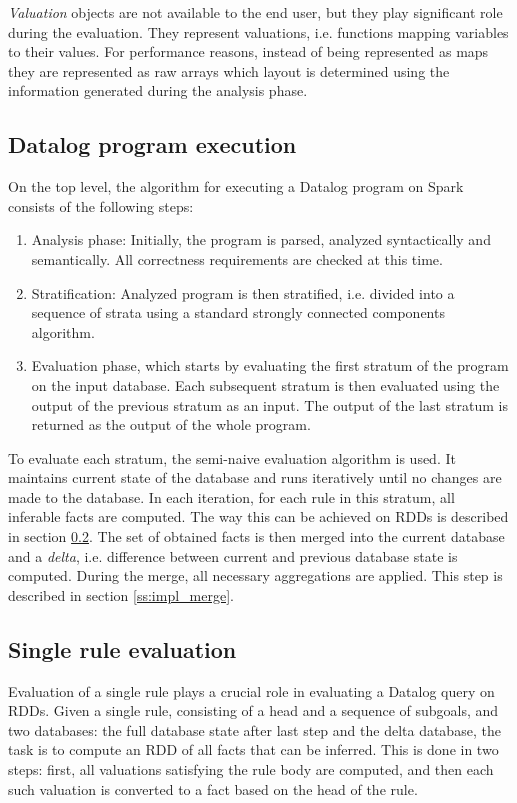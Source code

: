 \emph{Valuation} objects are not available to the end user, but they play significant role during the evaluation. They represent valuations, i.e. functions mapping variables to their values. For performance reasons, instead of being represented as maps they are represented as raw arrays which layout is determined using the information generated during the analysis phase.

\subsection{Datalog program execution}

On the top level, the algorithm for executing a Datalog program on Spark consists of the following steps:

\begin{enumerate}
\item Analysis phase: Initially, the program is parsed, analyzed syntactically and semantically. All correctness requirements are checked at this time.

\item Stratification: Analyzed program is then stratified, i.e. divided into a sequence of strata using a standard strongly connected components algorithm.

\item Evaluation phase, which starts by evaluating the first stratum of the program on the input database. Each subsequent stratum is then evaluated using the output of the previous stratum as an input. The output of the last stratum is returned as the output of the whole program.

\end{enumerate}

To evaluate each stratum, the semi-naive evaluation algorithm is used. It maintains current state of the database and runs iteratively until no changes are made to the database. In each iteration, for each rule in this stratum, all inferable facts are computed. The way this can be achieved on RDDs is described in section \ref{ss:impl_evalrule}. The set of obtained facts is then merged into the current database and a \emph{delta}, i.e. difference between current and previous database state is computed. During the merge, all necessary aggregations are applied. This step is described in section \ref{ss:impl_merge}.

\subsection{Single rule evaluation}\label{ss:impl_evalrule}
Evaluation of a single rule plays a crucial role in evaluating a Datalog query on RDDs. Given a single rule, consisting of a head and a sequence of subgoals, and two databases: the full database state after last step and the delta database, the task is to compute an RDD of all facts that can be inferred. This is done in two steps: first, all valuations satisfying the rule body are computed, and then each such valuation is converted to a fact based on the head of the rule.

